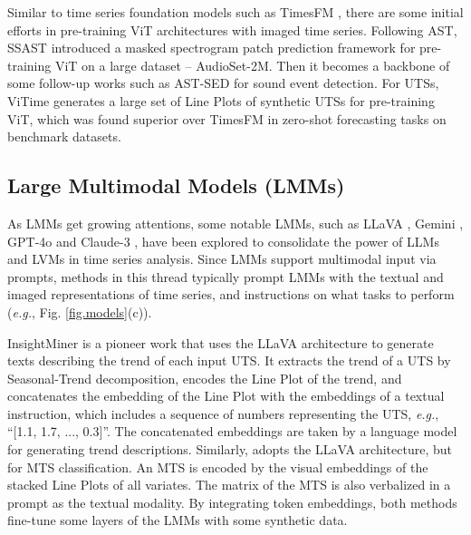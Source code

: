 Similar to %
time series foundation models %
such as TimesFM \cite{das2024decoder}, %
there are some initial efforts in pre-training ViT architectures with imaged time series. Following AST, SSAST \cite{gong2022ssast} introduced a %
masked spectrogram patch prediction framework for pre-training ViT on a large dataset -- AudioSet-2M. Then it becomes a backbone of some follow-up works such as AST-SED \cite{li2023ast} for sound event detection. %
For UTSs, ViTime \cite{yang2024vitime} generates a large set of Line Plots of synthetic UTSs for pre-training ViT, which was found superior over TimesFM in zero-shot forecasting tasks on benchmark datasets.

\subsection{Large Multimodal Models (LMMs)}\label{sec.lmms}

As LMMs %
get growing attentions, some %
notable LMMs, such as LLaVA \cite{liu2023visual}, Gemini \cite{team2023gemini}, GPT-4o \cite{achiam2023gpt} and Claude-3 \cite{anthropic2024claude}, have been explored to consolidate the power of LLMs %
and LVMs in time series analysis. 
Since LMMs support multimodal input via prompts, methods in this thread typically prompt LMMs with the textual and imaged representations of time series, %
and instructions on what tasks to perform ({\em e.g.}, Fig. \ref{fig.models}(c)).

InsightMiner \cite{zhang2023insight} is a pioneer work that uses the LLaVA architecture to generate %
texts describing the trend of each input UTS. It extracts the trend of a UTS by Seasonal-Trend decomposition, encodes the Line Plot of the trend, and concatenates the embedding of the Line Plot with the embeddings of a textual instruction, which includes a sequence of numbers representing the UTS, {\em e.g.}, ``[1.1, 1.7, ..., 0.3]''. The concatenated embeddings are taken by a language model for generating trend descriptions. %
Similarly, \cite{prithyani2024feasibility} adopts the LLaVA architecture, but for MTS classification. An MTS is encoded by %
the visual %
embeddings of the stacked Line Plots of all variates. %
The matrix of the MTS is also verbalized in a prompt 
as the textual modality. %
By integrating token embeddings, both %
methods fine-tune some layers of the LMMs with some synthetic data.


